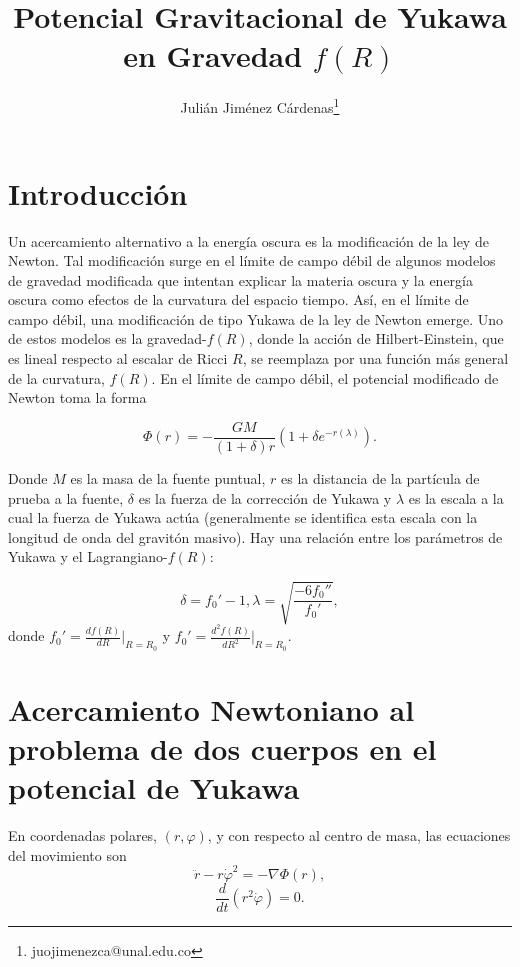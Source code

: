 \documentclass{article}
\begin{document}
	
	\title{Potencial Gravitacional de Yukawa en Gravedad $f(R)$}
	\author{Julián Jiménez Cárdenas\thanks{juojimenezca@unal.edu.co}}
	\date{}
	
	\maketitle
	
	\section{Introducción}

Un acercamiento alternativo a la energía oscura es la modificación de la ley de Newton. Tal modificación surge en el límite de campo débil de algunos modelos de gravedad modificada que intentan explicar la materia oscura y la energía oscura como efectos de la curvatura del espacio tiempo. Así, en el límite de campo débil, una modificación de tipo Yukawa de la ley de Newton emerge. Uno de estos modelos es la gravedad-$f(R)$, donde la acción de Hilbert-Einstein, que es lineal respecto al escalar de Ricci $R$, se reemplaza por una función más general de la curvatura, $f(R)$. En el límite de campo débil, el potencial modificado de Newton toma la forma

\begin{equation}\label{yukawaPotential}
\Phi(r)=-\frac{GM}{(1+\delta)r}(1+\delta e^{-r(\lambda)}).
\end{equation}

Donde $M$ es la masa de la fuente puntual, $r$ es la distancia de la partícula de prueba a la fuente, $\delta$ es la fuerza de la corrección de Yukawa y $\lambda$ es la escala a la cual la fuerza de Yukawa actúa (generalmente se identifica esta escala con la longitud de onda del gravitón masivo). Hay una relación entre los parámetros de Yukawa y el Lagrangiano-$f(R)$:

\begin{equation}
	\delta=f_0'-1, \lambda=\sqrt{\frac{-6f_0''}{f_0'}},
\end{equation} 
donde $f_0'=\frac{df(R)}{dR}\Big|_{R=R_0}$ y $f_0'=\frac{d^2f(R)}{dR^2}\Big|_{R=R_0}.$

\section{Acercamiento Newtoniano al problema de dos cuerpos en el potencial de Yukawa}\label{Acercamiento}
En coordenadas polares, $(r,\varphi)$, y con respecto al centro de masa, las ecuaciones del movimiento son
\begin{equation}
\ddot{r}-r\dot{\varphi}^2 = -\nabla \Phi(r),
\end{equation}
\begin{equation}\label{angularConservation}
	\frac{d}{dt}(r^2\dot{\varphi})=0.
\end{equation}
\end{document}
